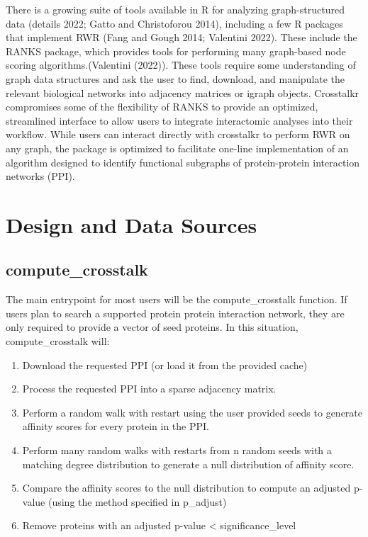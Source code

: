 \documentclass{article}
\providecommand{\tightlist}{%
  \setlength{\itemsep}{0pt}\setlength{\parskip}{0pt}}
\begin{document}
There is a growing suite of tools available in R for analyzing
graph-structured data (details 2022; Gatto and Christoforou 2014),
including a few R packages that implement RWR (Fang and Gough 2014;
Valentini 2022). These include the RANKS package, which provides tools
for performing many graph-based node scoring algorithms.(Valentini
(2022)). These tools require some understanding of graph data structures
and ask the user to find, download, and manipulate the relevant
biological networks into adjacency matrices or igraph objects.
Crosstalkr compromises some of the flexibility of RANKS to provide an
optimized, streamlined interface to allow users to integrate
interactomic analyses into their workflow. While users can interact
directly with crosstalkr to perform RWR on any graph, the package is
optimized to facilitate one-line implementation of an algorithm designed
to identify functional subgraphs of protein-protein interaction networks
(PPI).

\hypertarget{design-and-data-sources}{%
\section{Design and Data Sources}\label{design-and-data-sources}}

\hypertarget{compute_crosstalk}{%
\subsection{compute\_crosstalk}\label{compute_crosstalk}}

The main entrypoint for most users will be the compute\_crosstalk
function. If users plan to search a supported protein protein
interaction network, they are only required to provide a vector of seed
proteins. In this situation, compute\_crosstalk will:

\begin{enumerate}
\def\labelenumi{\arabic{enumi}.}
\tightlist
\item
  Download the requested PPI (or load it from the provided cache)
\item
  Process the requested PPI into a sparse adjacency matrix.
\item
  Perform a random walk with restart using the user provided seeds to
  generate affinity scores for every protein in the PPI.
\item
  Perform many random walks with restarts from n random seeds with a
  matching degree distribution to generate a null distribution of
  affinity score.
\item
  Compare the affinity scores to the null distribution to compute an
  adjusted p-value (using the method specified in p\_adjust)
\item
  Remove proteins with an adjusted p-value \textless{}
  significance\_level
\end{enumerate}
\end{document}
